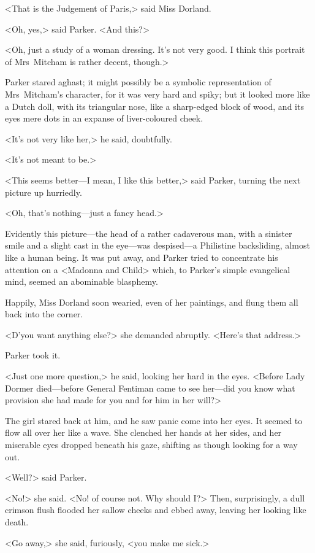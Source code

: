 <That is the Judgement of Paris,> said Miss Dorland.

<Oh, yes,> said Parker. <And this?>

<Oh, just a study of a woman dressing. It's not very good. I think this portrait of Mrs~Mitcham is rather decent, though.>

Parker stared aghast; it might possibly be a symbolic representation of Mrs~Mitcham's character, for it was very hard and spiky; but it looked more like a Dutch doll, with its triangular nose, like a sharp-edged block of wood, and its eyes mere dots in an expanse of liver-coloured cheek.

<It's not very like her,> he said, doubtfully.

<It's not meant to be.>

<This seems better—I mean, I like this better,> said Parker, turning the next picture up hurriedly.

<Oh, that's nothing—just a fancy head.>

Evidently this picture—the head of a rather cadaverous man, with a sinister smile and a slight cast in the eye—was despised—a Philistine backsliding, almost like a human being. It was put away, and Parker tried to concentrate his attention on a <Madonna and Child> which, to Parker's simple evangelical mind, seemed an abominable blasphemy.

Happily, Miss Dorland soon wearied, even of her paintings, and flung them all back into the corner.

<D'you want anything else?> she demanded abruptly. <Here's that address.>

Parker took it.

<Just one more question,> he said, looking her hard in the eyes. <Before Lady Dormer died—before General Fentiman came to see her—did you know what provision she had made for you and for him in her will?>

The girl stared back at him, and he saw panic come into her eyes. It seemed to flow all over her like a wave. She clenched her hands at her sides, and her miserable eyes dropped beneath his gaze, shifting as though looking for a way out.

<Well?> said Parker.

<No!> she said. <No! of course not. Why should I\@?> Then, surprisingly, a dull crimson flush flooded her sallow cheeks and ebbed away, leaving her looking like death.

<Go away,> she said, furiously, <you make me sick.>